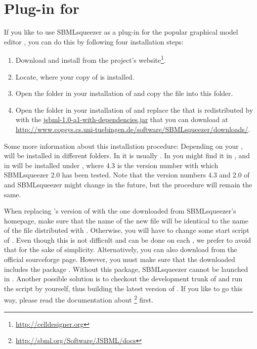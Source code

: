\section{Plug-in for \CellDesigner}
\label{sec:CellDesignerInstall}

If you like to use SBMLsqueezer as a plug-in for the popular graphical model
editor \CellDesigner, you can do this by following four installation steps:
\begin{enumerate}
  \item Download and install \CellDesigner from the project's website\footnote{\url{http://celldesigner.org}}.
  \item Locate, where your copy of \CellDesigner is installed. 
  \item Open the  folder in your installation of \CellDesigner and
        copy the file  into this folder.
  \item Open the  folder in your installation of \CellDesigner and
        replace the \JSBML \JAR that is redistributed by \CellDesigner with
        the \JAR \href{http://www.cogsys.cs.uni-tuebingen.de/software/SBMLsqueezer/downloads/jsbml-1.0-a1-with-dependencies.jar}{\url{jsbml-1.0-a1-with-dependencies.jar}}
        that you can download at \url{http://www.cogsys.cs.uni-tuebingen.de/software/SBMLsqueezer/downloads/}.
\end{enumerate}
Some more information about this installation procedure:
Depending on your \OS, \CellDesigner will be installed in different folders.
In \Windows it is usually
.
In \Linux you might find it in , and in \MacOSX \CellDesigner will be installed under
, where 4.3 is the version number with which SBMLsqueezer 2.0 has been tested.
Note that the version numbers 4.3 and 2.0 of \CellDesigner and SBMLsqueezer might change in the future, but the procedure will remain the same.

When replacing \CellDesigner's version of \JSBML with the one downloaded from SBMLsqueezer's homepage, 
make sure that the name of the new \JSBML file will be identical to the name of the \JSBML file distributed with \CellDesigner.
Otherwise, you will have to change some start script of \CellDesigner.
Even though this is not difficult and can be done on each \OS, we prefer to avoid that for the sake of simplicity.
Alternatively, you can also download \JSBML from the official sourceforge page.
However, you must make sure that the downloaded \JAR includes the package .
Without this package, SBMLsqueezer cannot be launched in \CellDesigner.
Another possible solution is to checkout the development trunk of \JSBML and run the \ant script by yourself, thus building the latest version of \JSBML.
If you like to go this way, please read the documentation about \JSBML\footnote{\url{http://sbml.org/Software/JSBML/docs}} first.



